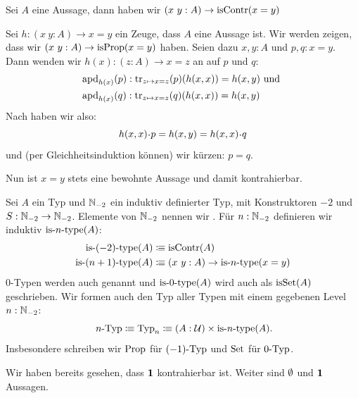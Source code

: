 \begin{lemma}
  \label{prop-id-contractible}
  Sei $A$ eine Aussage, dann haben wir
   $(x\ y :A)\to \mathrm{isContr}(x=y)$
\end{lemma}

\begin{beweis}
  Sei $h:(x\ y : A)\to x=y$ ein Zeuge, dass $A$ eine Aussage ist.
   Wir werden zeigen, dass wir $(x\ y : A)\to \mathrm{isProp}(x=y)$ haben.
    Seien dazu $x,y:A$ und $p,q:x=y$. Dann wenden wir $h(x):(z:A)\to x=z$ an auf $p$ und $q$:
    \begin{align*}
      &\mathrm{apd}_{h(x)}(p):\mathrm{tr}_{z\mapsto x=z}(p)(h(x,x))=h(x,y)\text{ und } \\
      &\mathrm{apd}_{h(x)}(q):\mathrm{tr}_{z\mapsto x=z}(q)(h(x,x))=h(x,y)
    \end{align*}
  Nach  haben wir also:
  \[
    h(x,x)\kon p=h(x,y)=h(x,x)\kon q
  \]
  und (per Gleichheitsinduktion können) wir kürzen: $p=q$.

  Nun ist $x=y$ stets eine bewohnte Aussage und damit kontrahierbar.
\end{beweis}

\begin{definition}
  Sei $A$ ein Typ und $\mathbb{N}_{-2}$ ein induktiv definierter Typ,
  mit Konstruktoren $-2$ und $S:\mathbb{N}_{-2}\to\mathbb{N}_{-2}$.
  Elemente von $\mathbb{N}_{-2}$ nennen wir .
  Für $n:\mathbb{N}_{-2}$ definieren wir induktiv $\mathrm{is}\mbox{-}{n}\mbox{-}\mathrm{type}(A)$:
  \begin{align*}
    \mathrm{is}\mbox{-}{(-2)}\mbox{-}\mathrm{type}(A)&\vcentcolon\mspace{-1.2mu}\equiv \mathrm{isContr}(A) \\
    \mathrm{is}\mbox{-}{(n+1)}\mbox{-}\mathrm{type}(A)&\vcentcolon\mspace{-1.2mu}\equiv (x\ y : A)\to \mathrm{is}\mbox{-}{n}\mbox{-}\mathrm{type}(x=y)
  \end{align*}
  $0$-Typen werden auch  genannt und $\mathrm{is}\mbox{-}{0}\mbox{-}\mathrm{type}(A)$ wird auch als $\mathrm{isSet}(A)$ geschrieben.
  Wir formen auch den Typ aller Typen mit einem gegebenen Level $n:\mathbb{N}_{-2}$:
  \[
    \nType{n}\colonequiv\mathrm{Typ}_n\colonequiv (A : \mU) \times \isNType{n}(A)\rlap{.}
    \]
    Insbesondere schreiben wir $\Prop$ für $(-1)\mbox{-}\mathrm{Typ}$ und $\Set$ für $0\mbox{-}\mathrm{Typ}$\index{$\Prop$}\index{$\Set$}.
\end{definition}

\begin{beispiel}
  Wir haben bereits gesehen, dass $\mathbf{1}$ kontrahierbar ist.
  Weiter sind $\emptyset$ und $\mathbf{1}$ Aussagen.
\end{beispiel}

